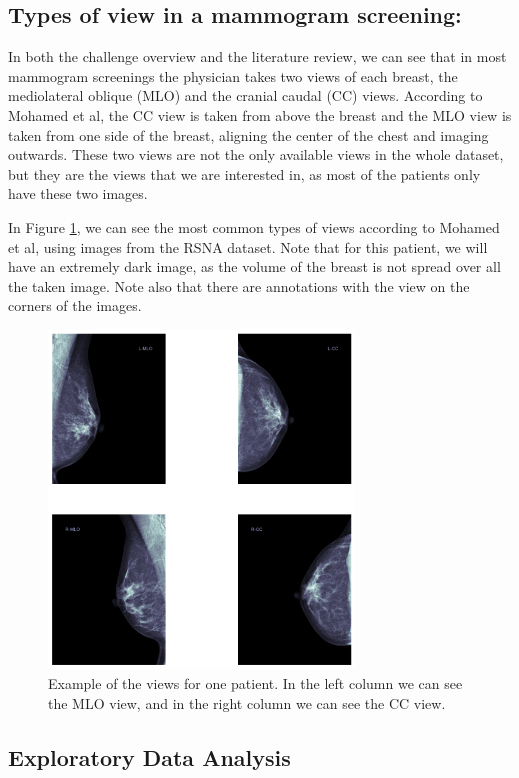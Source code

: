 \documentclass[conference]{IEEEtran}
\begin{document}
\subsection{Types of view in a mammogram screening:}

In both the challenge overview and the literature review, we can see that in most mammogram screenings the physician takes two views of each breast, the mediolateral oblique (MLO) and the cranial caudal (CC) views. According to Mohamed et al\cite{Mohamed2018}, the CC view is taken from above the breast and the MLO view is taken from one side of the breast, aligning the center of the chest and imaging outwards. These two views are not the only available views in the whole dataset, but they are the views that we are interested in, as most of the patients only have these two images. 

In Figure \ref{fig:types_of_view}, we can see the most common types of views according to Mohamed et al\cite{Mohamed2018}, using images from the RSNA dataset. Note that for this patient, we will have an extremely dark image, as the volume of the breast is not spread over all the taken image. Note also that there are annotations with the view on the corners of the images. 

\begin{figure}[ht]
\centering
\includegraphics[width=3.2in]{breast_images}
\caption{Example of the views for one patient. In the left column we can see the MLO view, and in the right column we can see the CC view. }
\label{fig:types_of_view}
\end{figure}

\subsection{Exploratory Data Analysis}
\end{document}
